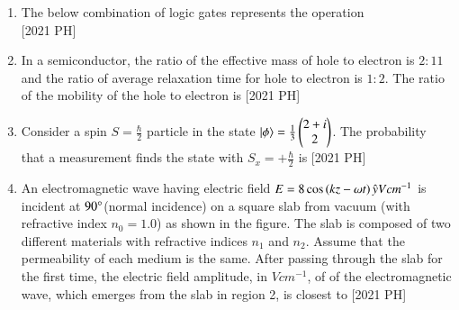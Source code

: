 \documentclass[journal]{IEEEtran}
\begin{document}
\begin{enumerate}
\item The below combination of logic gates represents the operation \\
 \hfill[2021 PH]
\item In a semiconductor, the ratio of the effective mass of hole to electron is $2:11$
and the ratio of average relaxation time for hole to electron is $1:2$. The ratio
of the mobility of the hole to electron is \hfill [2021 PH]
\begin{enumerate}
\end{enumerate}
\item Consider a spin $S = \frac{\hbar}{2}$ particle in the state $| \phi \rangle = \frac{1}{3} \begin{pmatrix}2 + i \\ 2\end{pmatrix}$. The probability that a measurement finds the state with $S_x = + \frac{\hbar}{2}$ is  \hfill [2021 PH]
\begin{enumerate}
\end{enumerate}
\item An electromagnetic wave having electric field $E = 8 \cos\left({kz - \omega t}\right) \hat{y}V cm^{-1}$ is incident at $90 \degree$(normal incidence) on a square slab from vacuum (with
refractive index $n_0 = 1.0$) as shown in the figure. The slab is composed of
two different materials with refractive indices $n_1$ and $n_2$. Assume that the
permeability of each medium is the same. After passing through the slab for
the first time, the electric field amplitude, in $V cm^{-1}$, of of the electromagnetic
wave, which emerges from the slab in region 2, is closest to \hfill [2021 PH]

\begin{enumerate}
\end{enumerate}

\end{enumerate}
\end{document}
